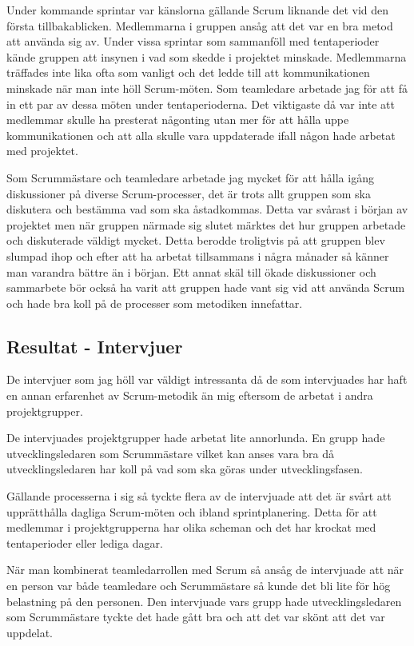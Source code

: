 Under kommande sprintar var känslorna gällande Scrum liknande det vid den första tillbakablicken. 
Medlemmarna i gruppen ansåg att det var en bra metod att använda sig av. Under vissa sprintar som sammanföll med tentaperioder kände gruppen att insynen i vad som skedde i projektet minskade.
Medlemmarna träffades inte lika ofta som vanligt och det ledde till att kommunikationen minskade när man inte höll Scrum-möten. Som teamledare arbetade jag för att få in ett par av dessa möten under tentaperioderna. 
Det viktigaste då var inte att medlemmar skulle ha presterat någonting utan mer för att hålla uppe kommunikationen och att alla skulle vara uppdaterade ifall någon hade arbetat med projektet.

Som Scrummästare och teamledare arbetade jag mycket för att hålla igång diskussioner på diverse Scrum-processer, det är trots allt gruppen som ska diskutera och bestämma vad som ska åstadkommas. 
Detta var svårast i början av projektet men när gruppen närmade sig slutet märktes det hur gruppen arbetade och diskuterade väldigt mycket. 
Detta berodde troligtvis på att gruppen blev slumpad ihop och efter att ha arbetat tillsammans i några månader så känner man varandra bättre än i början. 
Ett annat skäl till ökade diskussioner och sammarbete bör också ha varit att gruppen hade vant sig vid att använda Scrum och hade bra koll på de processer som metodiken innefattar.

\subsection{Resultat - Intervjuer}
De intervjuer som jag höll var väldigt intressanta då de som intervjuades har haft en annan erfarenhet av Scrum-metodik än mig eftersom de arbetat i andra projektgrupper. 

De intervjuades projektgrupper hade arbetat lite annorlunda. En grupp hade utvecklingsledaren som Scrummästare vilket kan anses vara bra då utvecklingsledaren har koll på vad som ska göras under utvecklingsfasen.

Gällande processerna i sig så tyckte flera av de intervjuade att det är svårt att upprätthålla dagliga Scrum-möten och ibland sprintplanering. Detta för att medlemmar i projektgrupperna har olika scheman och det har krockat med tentaperioder eller lediga dagar.

När man kombinerat teamledarrollen med Scrum så ansåg de intervjuade att när en person var både teamledare och Scrummästare så kunde det bli lite för hög belastning på den personen. 
Den intervjuade vars grupp hade utvecklingsledaren som Scrummästare tyckte det hade gått bra och att det var skönt att det var uppdelat.

